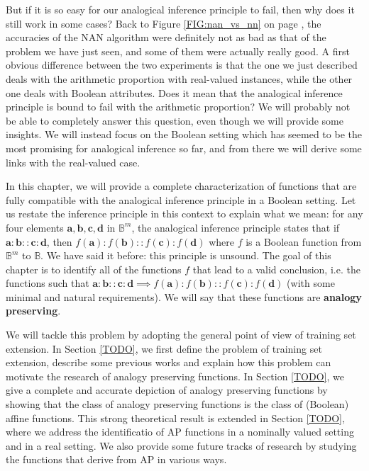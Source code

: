 But if it is so easy for our analogical inference principle to fail, then why does it still
work in some cases? Back to Figure \ref{FIG:nan_vs_nn} on page
\pageref{FIG:nan_vs_nn}, the accuracies of the NAN algorithm were definitely
not as bad as that of the problem we have just seen, and some of them were
actually really good. A first obvious difference between the two experiments is
that the one we just described deals with the arithmetic proportion with
real-valued instances, while the other one deals with Boolean attributes. Does
it mean that the analogical inference principle is bound to fail with the
arithmetic proportion? We will probably not be able to completely answer this
question, even though we will provide some insights.  We will instead focus on
the Boolean setting which has seemed to be the most promising for analogical
inference so far, and from there we will derive some links with the real-valued
case.

In this chapter, we will provide a complete characterization of functions that
are fully compatible with the analogical inference principle in a Boolean
setting. Let us restate the inference principle in this context to explain what
we mean: for any four elements $\mathbf{a}, \mathbf{b}, \mathbf{c}, \mathbf{d}$
in $\mathbb{B}^m$, the analogical inference principle states that if
$\mathbf{a}: \mathbf{b}:: \mathbf{c}: \mathbf{d}$, then $f(\mathbf{a}):
f(\mathbf{b}):: f(\mathbf{c}): f(\mathbf{d})$ where $f$ is a Boolean function
from $\mathbb{B}^m$ to $\mathbb{B}$. We have said it before:  this principle is
unsound. The goal of this chapter is to identify all of the functions $f$ that
lead to a valid conclusion, i.e. the functions such that $\mathbf{a}:
\mathbf{b}:: \mathbf{c}: \mathbf{d} \implies f(\mathbf{a}):f(\mathbf{b})::
f(\mathbf{c}): f(\mathbf{d})$ (with some minimal and natural requirements). We
will say that these functions are \textbf{analogy preserving}.

We will tackle this problem by adopting the general point of view of training
set extension. In Section \ref{TODO}, we first define the problem of training
set extension, describe some previous works and explain how this problem can
motivate the research of analogy preserving functions. In Section \ref{TODO},
we give a complete and accurate depiction of analogy preserving functions by
showing that the class of analogy preserving functions is the class of
(Boolean) affine functions. This strong theoretical result is extended in
Section \ref{TODO}, where we address the identificatio of AP functions in a
nominally valued setting and in a real setting. We also provide some future
tracks of research by studying the functions that derive from AP in various
ways.

